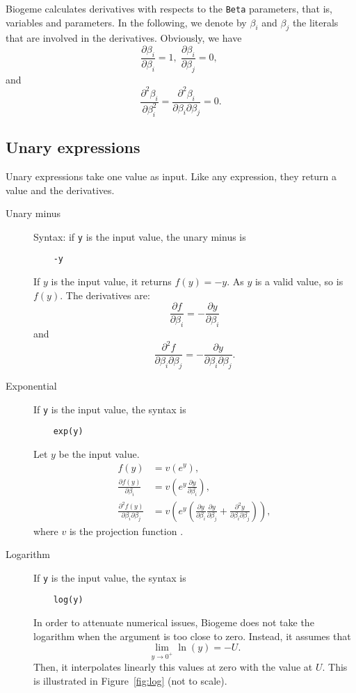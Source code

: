 \documentclass[12pt,a4paper]{article}
\begin{document}
Biogeme calculates derivatives with respects to the \lstinline+Beta+ parameters, that is, variables and parameters. In the following, we denote by $\beta_i$ and $\beta_j$ the literals that are involved in the derivatives.
Obviously, we have
\[
\frac{\partial \beta_i}{\partial \beta_i}=1, \;
\frac{\partial \beta_i}{\partial \beta_j}=0, \;
\]
and
\[
\frac{\partial^2 \beta_i}{\partial \beta_i^2}=\frac{\partial^2 \beta_i}{\partial \beta_i \partial \beta_j} = 0. 
\]


\subsection{Unary expressions}

Unary expressions take one value as input. Like any expression, they return a value and the derivatives.
\begin{description}
\item[Unary minus]
  Syntax: if \lstinline+y+ is the input value, the unary minus is
  \begin{lstlisting}
    -y
  \end{lstlisting}
  If $y$ is the input value, it returns $f(y)=-y$. 
  As $y$ is a valid value, so is $f(y)$. The derivatives are:
  \[
  \frac{\partial f}{\partial \beta_i} = - \frac{\partial y}{\partial \beta_i}
  \]
  and
  \[
  \frac{\partial^2 f}{\partial \beta_i \partial \beta_j} = - \frac{\partial y}{\partial \beta_i \partial \beta_j}.
  \]
\item[Exponential] If \lstinline+y+ is the input value, the syntax is
  \begin{lstlisting}
    exp(y)
  \end{lstlisting}
  Let $y$ be the input value.
  \begin{align*}
    f(y)& =v\left(e^y\right), \\
    \frac{\partial f(y)}{\partial \beta_i} &= v\left(e^y \frac{\partial y}{\partial \beta_i}\right), \\
    \frac{\partial^2 f(y)}{\partial \beta_i \partial \beta_j} &= v\left(e^y \left(\frac{\partial y}{\partial \beta_i}\frac{\partial y}{\partial \beta_j} + \frac{\partial^2 y}{\partial \beta_i \partial \beta_j}\right)\right),
  \end{align*}
    where $v$ is the projection function .

\item[Logarithm] If \lstinline+y+ is the input value, the syntax is
  \begin{lstlisting}
    log(y)
  \end{lstlisting}
  In order to attenuate numerical issues, Biogeme does not take the logarithm when the argument is too close to zero. Instead, it assumes that
  \[
\lim_{y \to 0^+} \ln(y) = -U.
  \]
Then, it interpolates linearly this values at zero with the value at  $U$.
This is illustrated in Figure~\vref{fig:log} (not to scale).


\end{description}
\end{document}
